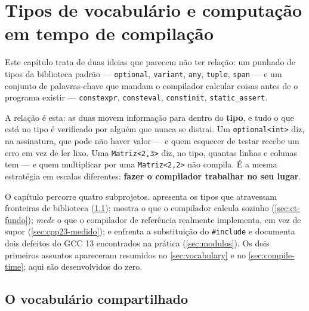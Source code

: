 
\section{Tipos de vocabulário e computação em tempo de compilação}
\label{sec:vocab-compile-time}

Este capítulo trata de duas ideias que parecem não ter relação: um punhado de
tipos da biblioteca padrão --- \texttt{optional}, \texttt{variant},
\texttt{any}, \texttt{tuple}, \texttt{span} --- e um conjunto de palavras-chave
que mandam o compilador calcular coisas antes de o programa existir ---
\texttt{constexpr}, \texttt{consteval}, \texttt{constinit},
\texttt{static\_assert}.

A relação é esta: as duas movem informação para dentro do \textbf{tipo}, e tudo
o que está no tipo é verificado por alguém que nunca se distrai. Um
\texttt{optional<int>} diz, na assinatura, que pode não haver valor --- e quem
esquecer de testar recebe um erro em vez de ler lixo. Uma
\texttt{Matriz<2,3>} diz, no tipo, quantas linhas e colunas tem --- e quem
multiplicar por uma \texttt{Matriz<2,2>} não compila. É a mesma estratégia em
escalas diferentes: \textbf{fazer o compilador trabalhar no seu lugar}.

O capítulo percorre quatro subprojetos.  apresenta os
tipos que atravessam fronteiras de biblioteca (\cref{sec:vocab-fundo});
 mostra o que o compilador calcula sozinho
(\cref{sec:ct-fundo});  \emph{mede} o que o compilador de
referência realmente implementa, em vez de supor (\cref{sec:cpp23-medido}); e
 enfrenta a substituição do \texttt{\#include} e documenta dois
defeitos do GCC 13 encontrados na prática (\cref{sec:modulos}). Os dois
primeiros assuntos apareceram resumidos no \cref{sec:vocabulary} e no
\cref{sec:compile-time}; aqui são desenvolvidos do zero.

\subsection{O vocabulário compartilhado}
\label{sec:vocab-fundo}

